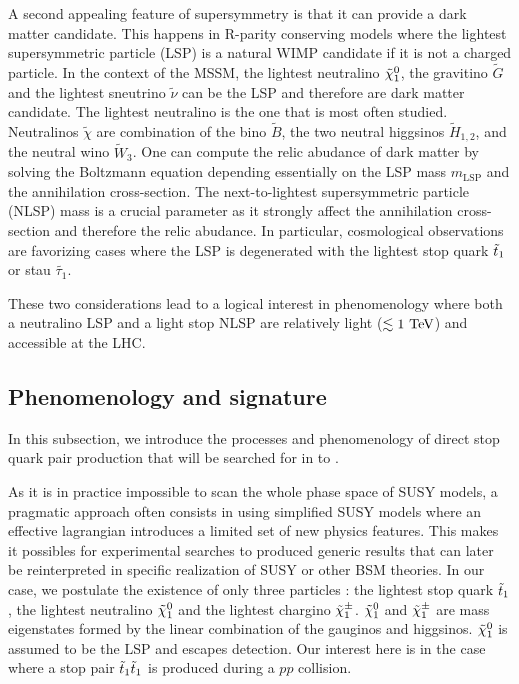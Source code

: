         A second appealing feature of supersymmetry is that it can provide a dark matter
        candidate. This happens in R-parity conserving models where the lightest supersymmetric
        particle (LSP) is a natural WIMP candidate if it is not a charged particle. In the
        context of the MSSM, the lightest neutralino $\tilde{\chi}_1^0$, the gravitino $\tilde{G}$
        and the lightest sneutrino $\tilde{\nu}$ can be the LSP and therefore are dark matter
        candidate. The lightest neutralino is the one that is most often studied. Neutralinos
        $\tilde{\chi}$ are combination of the bino $\tilde{B}$, the two neutral higgsinos
        $\tilde{H}_{1,2}$, and the neutral wino $\tilde{W}_3$. One can compute the relic
        abudance of dark matter by solving the Boltzmann equation \cite{EllisDarkMatter}
        depending essentially on the LSP mass $m_{\text{LSP}}$ and the annihilation cross-section.
        The next-to-lightest supersymmetric particle (NLSP) mass is a crucial parameter as
        it strongly affect the annihilation cross-section and therefore the relic abudance.
        In particular, cosmological observations are favorizing cases where the LSP is
        degenerated with the lightest stop quark $\tilde{t}_1$ or stau $\tilde{\tau_1}$.

        These two considerations lead to a logical interest in phenomenology where both a
        neutralino LSP and a light stop NLSP are relatively light ($\lesssim 1~\text{TeV}$) and
        accessible at the LHC.

        \subsection{Phenomenology and signature}

        In this subsection, we introduce the processes and phenomenology of direct stop
        quark pair production that will be searched for in
         to .

        As it is in practice impossible to scan the whole phase space of SUSY models, a
        pragmatic approach often consists in using simplified SUSY models where an
        effective lagrangian introduces a limited set of new physics features. This makes
        it possibles for experimental searches to produced generic results that can later
        be reinterpreted in specific realization of SUSY \cite{LiemSMS, SmodelS}
        or other BSM theories. In our case, we postulate the existence of only three
        particles : the lightest stop quark $\tilde{t}_1$, the lightest neutralino $\tilde{\chi}_1^0$
        and the lightest chargino $\tilde{\chi}_1^\pm$. $\tilde{\chi}_1^0$ and $\tilde{\chi}_1^\pm$ are mass
        eigenstates formed by the linear combination of the gauginos and  higgsinos.
        $\tilde{\chi}_1^0$ is assumed to be the LSP and escapes detection. Our interest here
        is in the case where a stop pair $\tilde{t}_1\tilde{t}_1$ is produced during a $pp$ collision.

